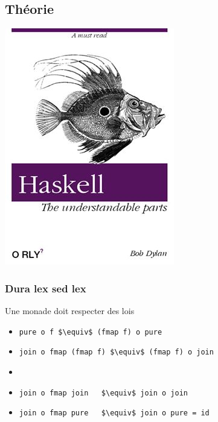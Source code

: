 \documentclass{beamer}
\begin{document}
\subsection{Théorie}
\begin{frame}
  \begin{center}
    \includegraphics[scale=0.6]{haskell-the-understandable-parts}
  \end{center}
\end{frame}

\begin{frame}
\frametitle{Dura lex sed lex}
\begin{alertblock}{Une monade doit respecter des lois}
\begin{itemize}
\item \verb!pure o f $\equiv$ (fmap f) o pure!
\item \verb!join o fmap (fmap f) $\equiv$ (fmap f) o join!
\item[] \ 
\item \verb!join o fmap join   $\equiv$ join o join!
\item \verb!join o fmap pure   $\equiv$ join o pure = id!
\end{itemize}
\end{alertblock}
\end{frame}
\end{document}
